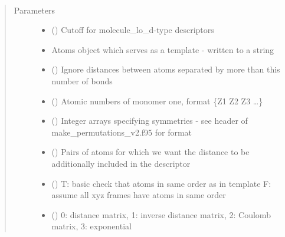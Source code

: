\documentclass[letterpaper,10pt,english]{sphinxmanual}
\begin{document}
\begin{fulllineitems}
\label{\detokenize{descriptors:gap.descriptors.molecule_lo_d}}~\begin{quote}\begin{description}
\item[{Parameters}] \leavevmode\begin{itemize}
\item {} 
 () \textendash{} Cutoff for molecule\_lo\_d-type descriptors

\item {} 
 \textendash{} Atoms object which serves as a template - written to a string

\item {} 
 () \textendash{} Ignore distances between atoms separated by more than this number of bonds

\item {} 
 () \textendash{} Atomic numbers of monomer one, format \{Z1 Z2 Z3 …\}

\item {} 
 () \textendash{} Integer arrays specifying symmetries - see header of make\_permutations\_v2.f95 for format

\item {} 
 () \textendash{} Pairs of atoms for which we want the distance to be additionally included in the descriptor

\item {} 
 () \textendash{} T: basic check that atoms in same order as in template F: assume all xyz frames have atoms in same order

\item {} 
 () \textendash{} 0: distance matrix, 1: inverse distance matrix, 2: Coulomb matrix, 3: exponential

\end{itemize}

\end{description}\end{quote}

\end{fulllineitems}
\end{document}

